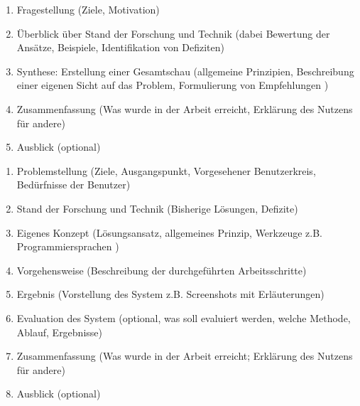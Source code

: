 \label{sec:anhang}

\label{subsec:a1}

\begin{enumerate}
    \item{Fragestellung (Ziele, Motivation)}
    \item{Überblick über Stand der Forschung und Technik (dabei Bewertung der Ansätze, Beispiele, Identifikation von Defiziten)}
    \item{Synthese: Erstellung einer Gesamtschau (allgemeine Prinzipien, Beschreibung einer eigenen Sicht auf das Problem, Formulierung von Empfehlungen )}
    \item{Zusammenfassung (Was wurde in der Arbeit erreicht, Erklärung des Nutzens für andere)}
    \item{Ausblick (optional)}
\end{enumerate}

\label{subsec:a1}

\begin{enumerate}
    \item{Problemstellung (Ziele, Ausgangspunkt, Vorgesehener Benutzerkreis, Bedürfnisse der Benutzer)}
    \item{Stand der Forschung und Technik (Bisherige Lösungen, Defizite)}
    \item{Eigenes Konzept (Lösungsansatz, allgemeines Prinzip, Werkzeuge z.B. Programmiersprachen )}
    \item{Vorgehensweise (Beschreibung der durchgeführten Arbeitsschritte)}
    \item{Ergebnis (Vorstellung des System z.B. Screenshots mit Erläuterungen)}
    \item{Evaluation des System (optional, was soll evaluiert werden, welche Methode, Ablauf, Ergebnisse)}
    \item{Zusammenfassung (Was wurde in der Arbeit erreicht; Erklärung des Nutzens für andere)}
    \item{Ausblick (optional)}
\end{enumerate}

\label{subsec:a1}

